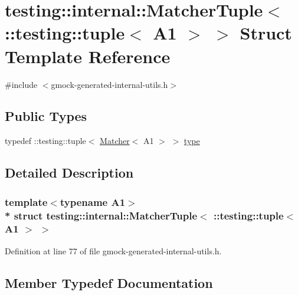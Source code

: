 \hypertarget{structtesting_1_1internal_1_1_matcher_tuple_3_01_1_1testing_1_1tuple_3_01_a1_01_4_01_4}{}\section{testing\+:\+:internal\+:\+:Matcher\+Tuple$<$ \+:\+:testing\+:\+:tuple$<$ A1 $>$ $>$ Struct Template Reference}
\label{structtesting_1_1internal_1_1_matcher_tuple_3_01_1_1testing_1_1tuple_3_01_a1_01_4_01_4}


{\ttfamily \#include $<$gmock-\/generated-\/internal-\/utils.\+h$>$}

\subsection*{Public Types}
\begin{DoxyCompactItemize}
\item 
typedef \+::testing\+::tuple$<$ \hyperlink{classtesting_1_1_matcher}{Matcher}$<$ A1 $>$ $>$ \hyperlink{structtesting_1_1internal_1_1_matcher_tuple_3_01_1_1testing_1_1tuple_3_01_a1_01_4_01_4_a8463ac100366f7e8b6ad1035e42ec4b0}{type}
\end{DoxyCompactItemize}


\subsection{Detailed Description}
\subsubsection*{template$<$typename A1$>$\\*
struct testing\+::internal\+::\+Matcher\+Tuple$<$ \+::testing\+::tuple$<$ A1 $>$ $>$}



Definition at line 77 of file gmock-\/generated-\/internal-\/utils.\+h.



\subsection{Member Typedef Documentation}
